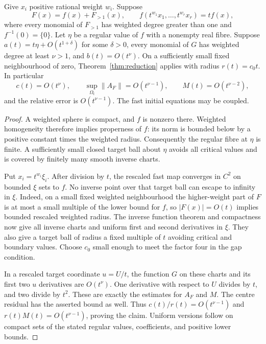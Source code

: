 \begin{corollary}\label{cor:newton}
Give $x_i$ positive rational weight $w_i$. Suppose
\[
 F(x)=f(x)+F_{>1}(x),\qquad f(t^{w_1}x_1,\ldots,t^{w_r}x_r)=t f(x),
\]
where every monomial of $F_{>1}$ has weighted degree greater than one and $f^{-1}(0)=\{0\}$. Let $\eta$ be a regular value of $f$ with a nonempty real fibre. Suppose $a(t)=t\eta+O(t^{1+\delta})$ for some $\delta>0$, every monomial of $G$ has weighted degree at least $\nu>1$, and $b(t)=O(t^\nu)$. On a sufficiently small fixed neighbourhood of zero, Theorem~\ref{thm:reduction} applies with radius $r(t)=c_0t$. In particular
\[
 c(t)=O(t^\nu),\qquad
 \sup_{\Omega_t}\|A_F\|=O(t^{\nu-1}),\qquad
 M(t)=O(t^{\nu-2}),
\]
and the relative error is $O(t^{\nu-1})$. The fast initial equations may be coupled.
\end{corollary}
\begin{proof}
A weighted sphere is compact, and $f$ is nonzero there. Weighted homogeneity therefore implies properness of $f$: its norm is bounded below by a positive constant times the weighted radius. Consequently the regular fibre at $\eta$ is finite. A sufficiently small closed target ball about $\eta$ avoids all critical values and is covered by finitely many smooth inverse charts.

Put $x_i=t^{w_i}\xi_i$. After division by $t$, the rescaled fast map converges in $C^2$ on bounded $\xi$ sets to $f$. No inverse point over that target ball can escape to infinity in $\xi$. Indeed, on a small fixed weighted neighbourhood the higher-weight part of $F$ is at most a small multiple of the lower bound for $f$, so $|F(x)|=O(t)$ implies bounded rescaled weighted radius. The inverse function theorem and compactness now give all inverse charts and uniform first and second derivatives in $\xi$. They also give a target ball of radius a fixed multiple of $t$ avoiding critical and boundary values. Choose $c_0$ small enough to meet the factor four in the gap condition.

In a rescaled target coordinate $u=U/t$, the function $G$ on these charts and its first two $u$ derivatives are $O(t^\nu)$. One derivative with respect to $U$ divides by $t$, and two divide by $t^2$. These are exactly the estimates for $A_F$ and $M$. The centre residual has the asserted bound as well. Thus $c(t)/r(t)=O(t^{\nu-1})$ and $r(t)M(t)=O(t^{\nu-1})$, proving the claim. Uniform versions follow on compact sets of the stated regular values, coefficients, and positive lower bounds.
\end{proof}

